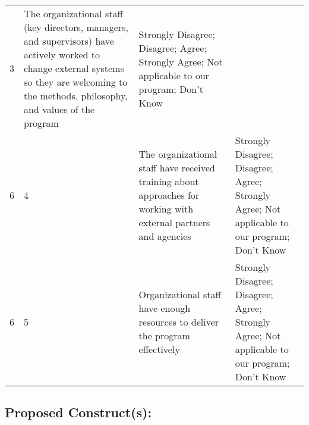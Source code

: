 \documentclass[]{article}
\begin{document}
\begin{longtable}[]{@{}llll@{}}
\begin{minipage}[t]{0.04\columnwidth}
3\strut
\end{minipage} & \begin{minipage}[t]{0.41\columnwidth}\raggedright\strut
The organizational staff (key directors, managers, and supervisors) have
actively worked to change external systems so they are welcoming to the
methods, philosophy, and values of the program\strut
\end{minipage} & \begin{minipage}[t]{0.39\columnwidth}\raggedright\strut
Strongly Disagree; Disagree; Agree; Strongly Agree; Not applicable to
our program; Don't Know\strut
\end{minipage}\tabularnewline
\begin{minipage}[t]{0.05\columnwidth}\raggedright\strut
6\strut
\end{minipage} & \begin{minipage}[t]{0.04\columnwidth}\raggedright\strut
4\strut
\end{minipage} & \begin{minipage}[t]{0.41\columnwidth}\raggedright\strut
The organizational staff have received training about approaches for
working with external partners and agencies\strut
\end{minipage} & \begin{minipage}[t]{0.39\columnwidth}\raggedright\strut
Strongly Disagree; Disagree; Agree; Strongly Agree; Not applicable to
our program; Don't Know\strut
\end{minipage}\tabularnewline
\begin{minipage}[t]{0.05\columnwidth}\raggedright\strut
6\strut
\end{minipage} & \begin{minipage}[t]{0.04\columnwidth}\raggedright\strut
5\strut
\end{minipage} & \begin{minipage}[t]{0.41\columnwidth}\raggedright\strut
Organizational staff have enough resources to deliver the program
effectively\strut
\end{minipage} & \begin{minipage}[t]{0.39\columnwidth}\raggedright\strut
Strongly Disagree; Disagree; Agree; Strongly Agree; Not applicable to
our program; Don't Know\strut
\end{minipage}\tabularnewline
\bottomrule
\end{longtable}

\subsection{\texorpdfstring{\textbf{Proposed
Construct(s)}:}{Proposed Construct(s):}}\label{proposed-constructs-5}
\end{document}
